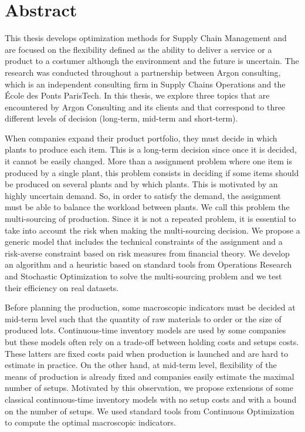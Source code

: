 \chapter*{Abstract} %
\label{cha:abstract}



This thesis develops optimization methods for Supply Chain Management and are focused on the flexibility defined as the ability to deliver a service or a product to a costumer although the environment and the future is uncertain.
The research was conducted throughout a partnership between Argon consulting, which is an independent consulting firm in Supply Chains Operations and the \'Ecole des Ponts ParisTech.
In this thesis, we explore three topics that are encountered by Argon Consulting and its clients and that correspond to three different levels of decision (long-term, mid-term and short-term).


When companies expand their product portfolio, they must decide in which plants to produce each item.
This is a long-term decision since once it is decided, it cannot be easily changed.
More than a assignment problem where one item is produced by a single plant, this problem  consists in deciding if some items should be produced on several plants and by which plants.
This is motivated by an highly uncertain demand.
So, in order to satisfy the demand, the assignment must be able to balance the workload between plants.
We call this problem the multi-sourcing of production.
Since it is not a repeated problem, it is essential to take into account the risk when making the multi-sourcing decision.
We propose a generic model that includes the technical constraints of the assignment and a risk-averse constraint based on risk measures from financial theory.
We develop an algorithm and a heuristic based on standard tools from Operations Research and Stochastic Optimization to solve the multi-sourcing problem and we test their efficiency on real datasets.


Before planning the production, some macroscopic indicators must be decided at mid-term level such that the quantity of raw materials to order or the size of produced lots.
Continuous-time inventory models are used by some companies but these models often rely on a trade-off between holding costs and setups costs.
These latters are fixed costs paid when production is launched and are hard to estimate in practice.
On the other hand, at mid-term level, flexibility of the means of production is already fixed and companies easily estimate the maximal number of setups.
Motivated by this observation, we propose extensions of some classical continuous-time inventory models with no setup costs and with a bound on the number of setups.
We used standard tools from Continuous Optimization to compute the optimal macroscopic indicators.


